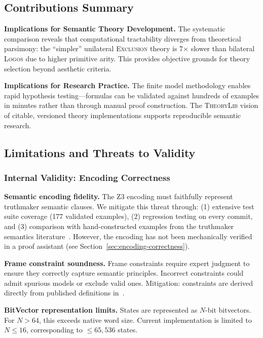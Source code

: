 \documentclass[pdflatex,sn-mathphys-num]{sn-jnl}
\newcommand{\theorylogos}{\textsc{Logos}}
\newcommand{\theoryexclusion}{\textsc{Exclusion}}
\newcommand{\theorylib}{\textsc{TheoryLib}}
\theoremstyle{thmstyleone}
\theoremstyle{thmstyletwo}
\theoremstyle{thmstylethree}
\begin{document}
\subsection{Contributions Summary}\label{sec:contributions}

\textbf{Implications for Semantic Theory Development.}
The systematic comparison reveals that computational tractability diverges from theoretical parsimony: the ``simpler'' unilateral \theoryexclusion{} theory is 7$\times$ slower than bilateral \theorylogos{} due to higher primitive arity.
This provides objective grounds for theory selection beyond aesthetic criteria.

\textbf{Implications for Research Practice.}
The finite model methodology enables rapid hypothesis testing---formulas can be validated against hundreds of examples in minutes rather than through manual proof construction.
The \theorylib{} vision of citable, versioned theory implementations supports reproducible semantic research.

\subsection{Limitations and Threats to Validity}\label{sec:limitations}

\subsubsection{Internal Validity: Encoding Correctness}

\textbf{Semantic encoding fidelity.}
The Z3 encoding must faithfully represent truthmaker semantic clauses.
We mitigate this threat through: (1) extensive test suite coverage (177 validated examples), (2) regression testing on every commit, and (3) comparison with hand-constructed examples from the truthmaker semantics literature~\cite{fine2017tms}.
However, the encoding has not been mechanically verified in a proof assistant (see Section~\ref{sec:encoding-correctness}).

\textbf{Frame constraint soundness.}
Frame constraints require expert judgment to ensure they correctly capture semantic principles.
Incorrect constraints could admit spurious models or exclude valid ones.
Mitigation: constraints are derived directly from published definitions in~\cite{fine2017tms,fine2017content}.

\textbf{BitVector representation limits.}
States are represented as $N$-bit bitvectors.
For $N > 64$, this exceeds native word size.
Current implementation is limited to $N \leq 16$, corresponding to $\leq 65{,}536$ states.
\end{document}
